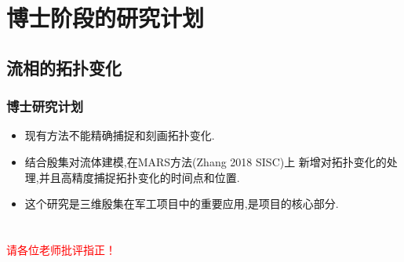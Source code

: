 \documentclass[UTF8]{ctexbeamer}	%
\theoremstyle{plain}
\theoremstyle{definition}
\theoremstyle{remark}
\numberwithin{equation}{section}
\begin{document}
\section{博士阶段的研究计划}
\subsection{流相的拓扑变化}
\begin{frame}
    \frametitle{博士研究计划}
    \begin{center}
    \end{center}
    \begin{itemize}
        \item 现有方法不能精确捕捉和刻画拓扑变化.
        \item 结合殷集对流体建模,在MARS方法(Zhang 2018 SISC)上
              新增对拓扑变化的处理,并且高精度捕捉拓扑变化的时间点和位置.
        \item 这个研究是三维殷集在军工项目中的重要应用,是项目的核心部分.
    \end{itemize}
\end{frame}



\section*{}
\begin{frame}
    \centering\huge
    \textcolor{red}{请各位老师批评指正！}
\end{frame}
\end{document}
